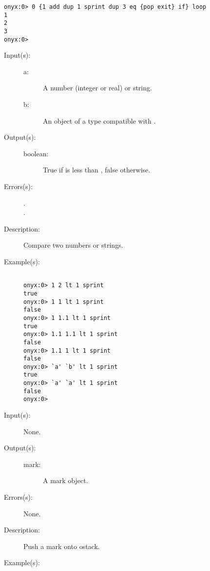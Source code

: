\begin{description}
\begin{description}
\begin{verbatim}
onyx:0> 0 {1 add dup 1 sprint dup 3 eq {pop exit} if} loop
1
2
3
onyx:0>
		\end{verbatim}
	\end{description}
\label{systemdict:lt}
\item[{\onyxop{a b}{lt}{boolean}}: ]
	\begin{description}\item[]
	\item[Input(s): ]
		\begin{description}\item[]
		\item[a: ]
			A number (integer or real) or string.
		\item[b: ]
			An object of a type compatible with .
		\end{description}
	\item[Output(s): ]
		\begin{description}\item[]
		\item[boolean: ]
			True if  is less than , false
			otherwise.
		\end{description}
	\item[Errors(s): ]
		\begin{description}\item[]
		\item[.]
		\item[.]
		\end{description}
	\item[Description: ]
		Compare two numbers or strings.
	\item[Example(s): ]\begin{verbatim}

onyx:0> 1 2 lt 1 sprint
true
onyx:0> 1 1 lt 1 sprint
false
onyx:0> 1 1.1 lt 1 sprint
true
onyx:0> 1.1 1.1 lt 1 sprint
false
onyx:0> 1.1 1 lt 1 sprint
false
onyx:0> `a' `b' lt 1 sprint
true
onyx:0> `a' `a' lt 1 sprint
false
onyx:0>
		\end{verbatim}
	\end{description}
\label{systemdict:mark}
\item[{\onyxop{--}{mark}{mark}}: ]
	\begin{description}\item[]
	\item[Input(s): ] None.
	\item[Output(s): ]
		\begin{description}\item[]
		\item[mark: ]
			A mark object.
		\end{description}
	\item[Errors(s): ] None.
	\item[Description: ]
		Push a mark onto ostack.
	\item[Example(s): ]\begin{verbatim}


\end{verbatim}
\end{description}
\end{description}
